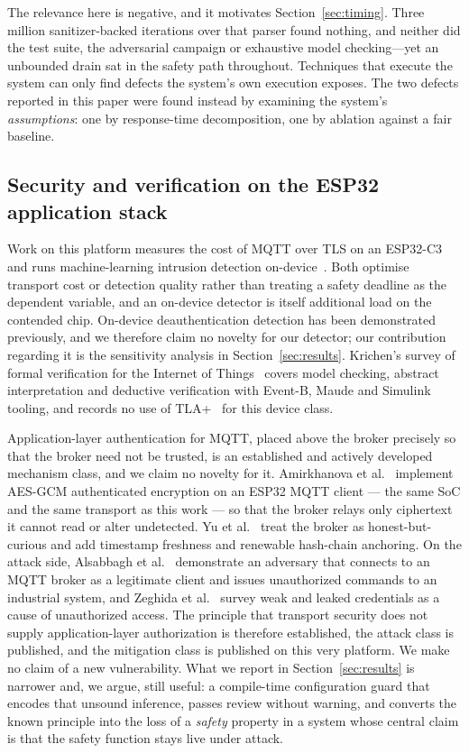 The relevance here is negative, and it motivates Section~\ref{sec:timing}. Three million
sanitizer-backed iterations over that parser found nothing, and neither did the test suite, the
adversarial campaign or exhaustive model checking---yet an unbounded drain sat in the safety
path throughout. Techniques that execute the system can only find defects the system's own
execution exposes. The two defects reported in this paper were found instead by examining the
system's \emph{assumptions}: one by response-time decomposition, one by ablation against a fair
baseline.

\subsection{Security and verification on the ESP32 application stack}

Work on this platform measures the cost of MQTT over TLS on an ESP32-C3~\cite{mqtttls2026} and
runs machine-learning intrusion detection on-device~\cite{ondevice2026}. Both optimise transport
cost or detection quality rather than treating a safety deadline as the dependent variable, and
an on-device detector is itself additional load on the contended chip. On-device
deauthentication detection has been demonstrated previously, and we therefore claim no novelty
for our detector; our contribution regarding it is the sensitivity analysis in
Section~\ref{sec:results}. Krichen's survey of formal verification for the Internet of
Things~\cite{krichen2023} covers model checking, abstract interpretation and deductive
verification with Event-B, Maude and Simulink tooling, and records no use of
TLA+~\cite{lamport2002} for this device class.

Application-layer authentication for MQTT, placed above the broker precisely so that the broker
need not be trusted, is an established and actively developed mechanism class, and we claim no
novelty for it. Amirkhanova et al.~\cite{amirkhanova2026} implement AES-GCM authenticated
encryption on an ESP32 MQTT client --- the same SoC and the same transport as this work --- so
that the broker relays only ciphertext it cannot read or alter undetected. Yu et
al.~\cite{mqttl2026} treat the broker as honest-but-curious and add timestamp freshness and
renewable hash-chain anchoring. On the attack side, Alsabbagh et al.~\cite{pirates2024}
demonstrate an adversary that connects to an MQTT broker as a legitimate client and issues
unauthorized commands to an industrial system, and Zeghida et al.~\cite{zeghida2024} survey
weak and leaked credentials as a cause of unauthorized access. The principle that transport
security does not supply application-layer authorization is therefore established, the attack
class is published, and the mitigation class is published on this very platform. We make no
claim of a new vulnerability. What we report in Section~\ref{sec:results} is narrower and, we
argue, still useful: a compile-time configuration guard that encodes that unsound inference,
passes review without warning, and converts the known principle into the loss of a
\emph{safety} property in a system whose central claim is that the safety function stays live
under attack.

